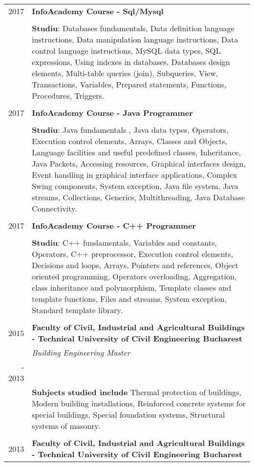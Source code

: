 \documentclass[a4paper,10pt]{article} %
\begin{document}
\begin{tabular}{r|p{15cm}}
2017 & \large\textbf{InfoAcademy Course - Sql/Mysql}\\
& \\
& \textbf{Studiu}: Databases fundamentals, Data definition language instructions, Data manipulation language instructions, Data control language instructions, MySQL data types, SQL expressions, Using indexes in databases, Databases design elements, Multi-table queries (join), Subqueries, View, Transactions, Variables, Prepared statements, Functions, Procedures, Triggers.\\
& \\
2017 & \large\textbf{InfoAcademy Course - Java Programmer}\\
& \\
& \textbf{Studiu}: Java fundamentals , Java data types, Operators, Execution control elements, Arrays, Classes and Objects, Language facilities and useful predefined classes, Inheritance, Java Packets, Accessing resources, Graphical interfaces design, Event handling in graphical interface applications, Complex Swing components, System exception, Java file system, Java streams, Collections, Generics, Multithreading, Java Database Connectivity.\\
& \\
2017 & \large\textbf{InfoAcademy Course - C++ Programmer}\\
& \\
& \textbf{Studiu}: C++ fundamentals, Variables and constants, Operators, C++ preprocessor, Execution control elements, Decisions and loops, Arrays, Pointers and references, Object oriented programming, Operators overloading, Aggregation, class inheritance and polymorphism, Template classes and template functions, Files and streams, System exception, Standard template library.\\
& \\
2015 & \large\textbf{Faculty of Civil, Industrial and Agricultural Buildings - Technical University of Civil Engineering Bucharest}\\
& \emph{Building Engineering Master} \\
- 2013 & \\
& \textbf{Subjects studied include} Thermal protection of buildings, Modern building installations, Reinforced concrete systems for special buildings, Special foundation systems, Structural systems of masonry. \\
& \\
2013 & \large\textbf{Faculty of Civil, Industrial and Agricultural Buildings - Technical University of Civil Engineering Bucharest}\\

\end{tabular}
\end{document}
